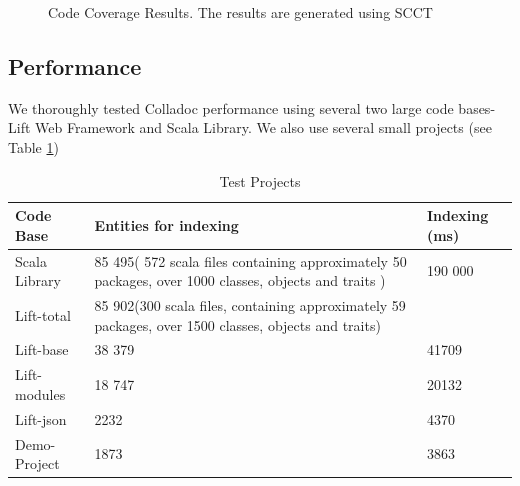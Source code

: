 \begin{figure}[h!t]
\begin{center}
\leavevmode
{}
\end{center}
\caption{Code Coverage Results. The results are generated using SCCT}
\label{fig:codecoverage}
\end{figure}

\subsection{Performance}
We thoroughly tested Colladoc performance using several two large code bases-Lift Web Framework and Scala Library. We also use several small projects (see Table \ref{tab:test-projects})

\begin{table}
\begin{tabular}{|p{0.9in}|p{2.2in}|p{1.2in}|} \hline 
Code Base & Entities for indexing & Indexing (ms)\\ \hline 
Scala Library & 85 495\newline ( 572 scala files containing approximately 50 packages, over 1000 classes, objects and traits ) & 190 000 \\ \hline 
Lift-total & 85 902\newline (300 scala files, containing approximately 59 packages, over 1500 classes, objects and traits) &  \\ \hline 
Lift-base & 38 379 & 41709\\ \hline
Lift-modules & 18 747 & 20132\\ \hline
Lift-json &	2232 & 4370\\ \hline
Demo-Project &	1873 & 3863\\ \hline
\end{tabular}
\caption{Test Projects}
\label{tab:test-projects}
\end{table}

